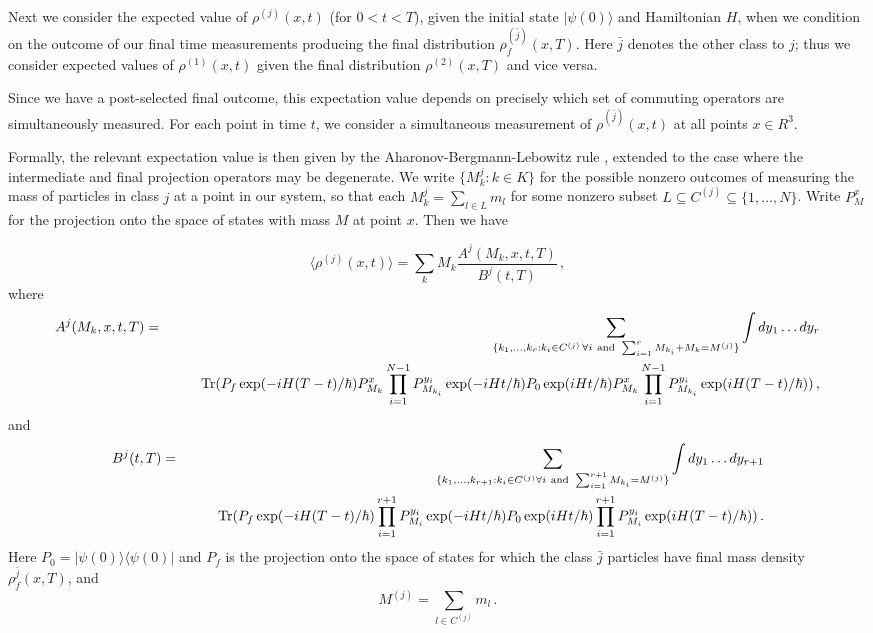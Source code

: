 \documentclass[aps,prl]{revtex4}
\def\bra#1{\langle #1 |}
\def\ket#1{| #1\rangle}
\def\Tr{{\rm Tr}}
\begin{document}
Next we consider the expected value of $\rho^{(j)}(x,t)$ (for $0 < t < T$), 
given the initial state $\ket{\psi(0)}$ and Hamiltonian $H$, 
when we condition on the outcome of our final time measurements
producing the final distribution $\rho^{(\bar{j})}_f (x,T)$. 
Here $\bar{j}$ denotes the other class to $j$; thus we consider 
expected values of $\rho^{(1)} (x,t)$ given the final distribution
$\rho^{(2)} (x, T)$ and vice versa.  

Since we have a post-selected final outcome,
this expectation value depends on precisely which set of 
commuting operators are simultaneously measured. 
For each point in time $t$, 
we consider a simultaneous measurement of $\rho^{(\bar{j})}(x,t)$ at all
points $x \in R^3$. 

Formally, the relevant expectation value is then
given by the Aharonov-Bergmann-Lebowitz
rule \cite{aharonov1964time}, extended to the case where the
intermediate and final projection operators may be degenerate.
We write $\{ M_k^j : k \in K \}$ for the possible nonzero outcomes of measuring
the mass of particles in class $j$
at a point in our system, so that each $M_k^j = \sum_{l \in L}
m_l $ for some nonzero subset $L \subseteq C^{(j)} \subseteq
\{ 1 , \ldots , N \}$. 
Write $P_M^x$ for the projection onto the space of states with
mass $M$ at point $x$.   
Then we have 

\begin{equation}
\langle \rho^{(j)} (x,t) \rangle =  \sum_k M_k 
 \frac{ A^j (M_k , x, t, T)}{B^j (t,T)} \, , 
\end{equation}
where 
\begin{eqnarray}
A^j (M_k, x, t, T) &=&
\sum_{\{ k_1 , \ldots , k_{r} : k_i \in C^{(j)} \, \forall i {\rm~and~}
\sum_{i=1}^{r} M_{k_i} + M_k =
 M^{(j)} \} } 
\int dy_1 \ldots dy_{r} \\
&& \qquad  \Tr ( P_f \exp ( - i H (T-t) /
\hbar ) P_{M_k}^x \prod_{i=1}^{N-1} P_{M_{k_i}}^{y_i}
 \exp ( - i H t / \hbar ) P_0 \exp (  i H t /
\hbar ) P_{M_k}^x \prod_{i=1}^{N-1} P_{M_{k_i}}^{y_i} \exp (  i H (T-t) / \hbar )  )
\, , \nonumber 
\end{eqnarray}
and
\begin{eqnarray}
B^j (t,T) &=& \sum_{\{ k_1 , \ldots , k_{r+1} : k_i \in C^{(j)} \forall i
  {\rm~and~}
\sum_{i=1}^{r+1} M_{k_i} =
 M^{(j)} \} } 
\int dy_1 \ldots dy_{r+1}  \\
&& \qquad \Tr ( P_f \exp ( - i H (T-t) /
\hbar )  \prod_{i=1}^{r+1}  P_{M_i}^{y_i}  \exp ( - i H t / \hbar ) P_0 
\exp (  i H t / \hbar ) \prod_{i=1}^{r+1}  P_{M_i}^{y_i}  \exp (  i H (T-t) /
\hbar ) ) \, . \nonumber 
\end{eqnarray}
Here $P_0 = \ket{\psi (0 ) }\bra{ \psi(0)}$ and 
$P_{f}$ is the projection onto the space of states for which
the class $\bar{j}$ particles have final 
mass density $\rho_f^{\bar{j}} (x,T)$, and
$$
M^{(j)} = \sum_{l \in C^{(j)}} m_l \, .
$$
\end{document}

